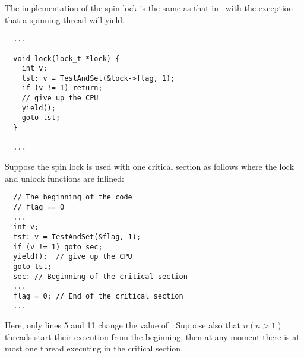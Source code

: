 \documentclass{article}[10pt]
\begin{document}
\begin{mythm}
\label{thm:spin-lock-correct-yield}

The implementation of the spin lock is the same as that
in~ with the exception that a spinning
thread will yield.
%
\begin{lstlisting}
  ...

  void lock(lock_t *lock) {
    int v;
    tst: v = TestAndSet(&lock->flag, 1);
    if (v != 1) return; 
    // give up the CPU
    yield();
    goto tst;
  }

  ...
\end{lstlisting}
%
Suppose the spin lock is used with one critical section as follows
where the lock and unlock functions are inlined:
%
\begin{lstlisting}
  // The beginning of the code
  // flag == 0
  ...
  int v;
  tst: v = TestAndSet(&flag, 1);
  if (v != 1) goto sec; 
  yield();  // give up the CPU
  goto tst;
  sec: // Beginning of the critical section
  ...
  flag = 0; // End of the critical section
  ...
\end{lstlisting}
%
Here, only lines 5 and 11 change the value of \kflag.
%
Suppose also that $n (n > 1)$ threads start their execution from the
beginning, then at any moment there is at most one thread executing in
the critical section.
\end{mythm}
%
\end{document}

